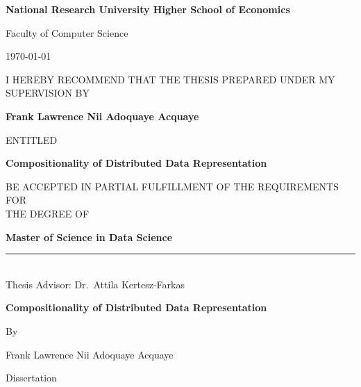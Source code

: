 
\thispagestyle{empty}%


\begin{center}
{\bf\LARGE National Research University Higher School of Economics}

\par Faculty of Computer Science

\par\vspace{3mm}\hfill \today

\par\vspace{10mm}
I HEREBY RECOMMEND THAT THE THESIS PREPARED UNDER MY SUPERVISION BY

\par\vspace{2mm}
{\bf Frank Lawrence Nii Adoquaye Acquaye}

\par\vspace{5mm}
ENTITLED

{\bf\large Compositionality of Distributed Data Representation }

\par\vspace{5mm}
BE ACCEPTED IN PARTIAL FULFILLMENT OF THE REQUIREMENTS FOR\\ THE DEGREE OF

\par\vspace{5mm}
{\bf Master of Science in Data Science}
\end{center}

\vfill

\parbox[t]{50mm}{
\rule{50mm}{0.5pt}\\Thesis Advisor: Dr.~Attila Kertesz-Farkas
}

\newpage\thispagestyle{empty}%


\begin{center}
\vspace*{15mm}
\bf
{\Large Compositionality of Distributed Data Representation }

\par\vspace{8mm}
By 

\par\vspace{8mm}
Frank Lawrence Nii Adoquaye Acquaye

\par\vspace{50mm}
Dissertation
\end{center}

